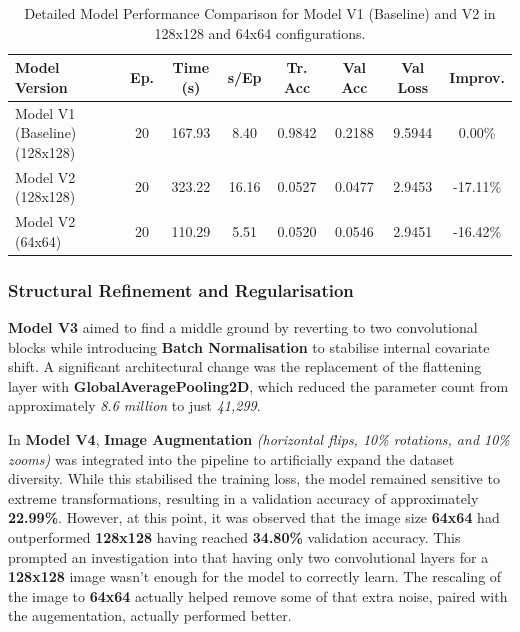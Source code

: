 \documentclass[a4paper,11pt]{article}
\begin{document}
\begin{table}[h]
\centering
\small 
\setlength{\tabcolsep}{3pt} 
\caption{Detailed Model Performance Comparison for Model V1 (Baseline) and V2 in 128x128 and 64x64 configurations.}
\label{tab:model_performance_refinement_and_regularisation}
\begin{tabular}{|l|c|c|c|c|c|c|c|}
\hline
\textbf{Model Version} & \textbf{Ep.} & \textbf{Time (s)} & \textbf{s/Ep} & \textbf{Tr. Acc} & \textbf{Val Acc} & \textbf{Val Loss} & \textbf{Improv.} \\ \hline
Model V1 (Baseline) (128x128) & 20 & 167.93 & 8.40 & 0.9842 & 0.2188 & 9.5944 & 0.00\% \\ \hline
Model V2 (128x128)            & 20 & 323.22 & 16.16 & 0.0527 & 0.0477 & 2.9453 & -17.11\%  \\ \hline
Model V2 (64x64)              & 20 & 110.29 & 5.51  & 0.0520 & 0.0546 & 2.9451 & -16.42\% \\ \hline
\end{tabular}
\end{table}

\subsubsection{Structural Refinement and Regularisation}
\textbf{Model V3} aimed to find a middle ground by reverting to two convolutional blocks while introducing \textbf{Batch Normalisation} to stabilise internal covariate shift. A significant architectural change was the replacement of the flattening layer with \textbf{GlobalAveragePooling2D}, which reduced the parameter count from approximately \textit{8.6 million} to just \textit{41,299}.

In \textbf{Model V4}, \textbf{Image Augmentation} \textit{(horizontal flips, 10\% rotations, and 10\% zooms)} was integrated into the pipeline to artificially expand the dataset diversity. While this stabilised the training loss, the model remained sensitive to extreme transformations, resulting in a validation accuracy of approximately \textbf{22.99\%}. However, at this point, it was observed that the image size \textbf{64x64} had outperformed \textbf{128x128} having reached \textbf{34.80\%} validation accuracy. This prompted an investigation into that having only two convolutional layers for a \textbf{128x128} image wasn't enough for the model to correctly learn. The rescaling of the image to \textbf{64x64} actually helped remove some of that extra noise, paired with the augementation, actually performed better.
\end{document}
